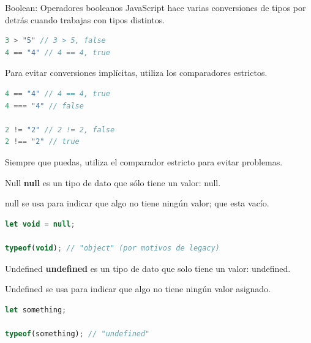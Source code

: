 \documentclass{beamer}
\begin{document}
\begin{frame}[fragile]{Boolean: Operadores booleanos}
JavaScript hace varias conversiones de tipos por detrás cuando trabajas con tipos distintos.
\begin{lstlisting}[language=JavaScript]
3 > "5" // 3 > 5, false
4 == "4" // 4 == 4, true
\end{lstlisting}\pause

Para evitar conversiones implícitas, utiliza los comparadores estrictos.
\begin{lstlisting}[language=JavaScript]
4 == "4" // 4 == 4, true
4 === "4" // false

2 != "2" // 2 != 2, false
2 !== "2" // true
\end{lstlisting}
Siempre que puedas, utiliza el comparador estricto para evitar problemas.


\end{frame}

\begin{frame}[fragile]{Null}
\textbf{null} es un tipo de dato que sólo tiene un valor: null.

null se usa para indicar que algo no tiene ningún valor; que esta vacío.

\begin{lstlisting}[language=JavaScript]
let void = null;

typeof(void); // "object" (por motivos de legacy)

\end{lstlisting}
\end{frame}

\begin{frame}[fragile]{Undefined}
\textbf{undefined} es un tipo de dato que solo tiene un valor: undefined.

Undefined se usa para indicar que algo no tiene ningún valor asignado.

\begin{lstlisting}[language=JavaScript]
let something;

typeof(something); // "undefined"
\end{lstlisting}
\end{frame}
\end{document}
